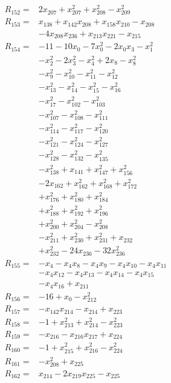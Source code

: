 \begin{align*}
R_{152}={}&2x_{207} +x_{207}^{2} +x_{208}^{2} -x_{209}^{2}\\[3pt]
R_{153}={}&x_{138} +x_{142}x_{208} +x_{158}x_{210} -x_{208}\\
&-4x_{208}x_{236} +x_{213}x_{221} -x_{215}\\[3pt]
R_{154}={}&-11 -10x_{0} -7x_{0}^{2} -2x_{0}x_{3} -x_{1}^{2}\\
&-x_{2}^{2} -2x_{3}^{2} -x_{4}^{2} +2x_{8} -x_{8}^{2}\\
&-x_{9}^{2} -x_{10}^{2} -x_{11}^{2} -x_{12}^{2}\\
&-x_{13}^{2} -x_{14}^{2} -x_{15}^{2} -x_{16}^{2}\\
&-x_{17}^{2} -x_{102}^{2} -x_{103}^{2}\\
&-x_{107}^{2} -x_{108}^{2} -x_{111}^{2}\\
&-x_{114}^{2} -x_{117}^{2} -x_{120}^{2}\\
&-x_{121}^{2} -x_{124}^{2} -x_{127}^{2}\\
&-x_{128}^{2} -x_{132}^{2} -x_{135}^{2}\\
&-x_{138}^{2} +x_{141} +x_{147}^{2} +x_{156}^{2}\\
&-2x_{162} +x_{162}^{2} +x_{168}^{2} +x_{172}^{2}\\
&+x_{176}^{2} +x_{180}^{2} +x_{184}^{2}\\
&+x_{188}^{2} +x_{192}^{2} +x_{196}^{2}\\
&+x_{200}^{2} +x_{204}^{2} -x_{208}^{2}\\
&-x_{211}^{2} +x_{230}^{2} +x_{231}^{2} +x_{232}\\
&+x_{232}^{2} -24x_{236} -32x_{236}^{2}\\[3pt]
R_{155}={}&-x_{4} -x_{4}x_{8} -x_{4}x_{9} -x_{4}x_{10} -x_{4}x_{11}\\
&-x_{4}x_{12} -x_{4}x_{13} -x_{4}x_{14} -x_{4}x_{15}\\
&-x_{4}x_{16} +x_{211}\\[3pt]
R_{156}={}&-16 +x_{0} -x_{212}^{2}\\[3pt]
R_{157}={}&-x_{142}x_{214} -x_{214} +x_{223}\\[3pt]
R_{158}={}&-1 +x_{213}^{2} +x_{214}^{2} -x_{223}^{2}\\[3pt]
R_{159}={}&-x_{216} -x_{216}x_{217} +x_{224}\\[3pt]
R_{160}={}&-1 +x_{215}^{2} +x_{216}^{2} -x_{224}^{2}\\[3pt]
R_{161}={}&-x_{208}^{2} +x_{225}\\[3pt]
R_{162}={}&x_{214} -2x_{219}x_{225} -x_{225}\\[3pt]

\end{align*}
